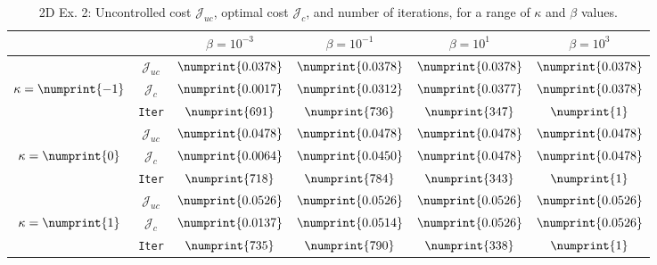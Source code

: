 \begin{table}
\begin{tabular}{ | c | c || c | c | c | c ||}
\hline
\multicolumn{2}{|c||}{}& $\beta = 10^{-3}$ & $\beta = 10^{-1}$ & $\beta = 10^{1}$ & $\beta = 10^{3}$  \\
\hline
\hline
 & $\mathcal{J}_{uc}$ & $\numprint{0.0378}$ & $\numprint{0.0378}$ & $\numprint{0.0378}$ & $\numprint{0.0378}$ \\
$\kappa= \numprint{-1}$  & $\mathcal{J}_c$ & $\numprint{0.0017}$ & $\numprint{0.0312}$ & $\numprint{0.0377}$ & $\numprint{0.0378}$ \\
& \texttt{Iter} & $\numprint{691}$ & $\numprint{736}$ & $\numprint{347}$ & $\numprint{1}$ \\
\hline
 & $\mathcal{J}_{uc}$ & $\numprint{0.0478}$ & $\numprint{0.0478}$ & $\numprint{0.0478}$ & $\numprint{0.0478}$ \\
$\kappa= \numprint{0}$  & $\mathcal{J}_c$ & $\numprint{0.0064}$ & $\numprint{0.0450}$ & $\numprint{0.0478}$ & $\numprint{0.0478}$ \\
& \texttt{Iter} & $\numprint{718}$ & $\numprint{784}$ & $\numprint{343}$ & $\numprint{1}$ \\
\hline
 & $\mathcal{J}_{uc}$ & $\numprint{0.0526}$ & $\numprint{0.0526}$ & $\numprint{0.0526}$ & $\numprint{0.0526}$ \\
$\kappa= \numprint{1}$  & $\mathcal{J}_c$ & $\numprint{0.0137}$ & $\numprint{0.0514}$ & $\numprint{0.0526}$ & $\numprint{0.0526}$ \\
& \texttt{Iter} & $\numprint{735}$ & $\numprint{790}$ & $\numprint{338}$ & $\numprint{1}$ \\
\hline
\end{tabular}
\caption{2D Ex. 2: Uncontrolled cost $\mathcal{J}_{uc}$, optimal cost $\mathcal{J}_{c}$, and number of iterations, for a range of $\kappa$ and $\beta$ values.}
\label{TabS5:Prob22D}
\end{table}